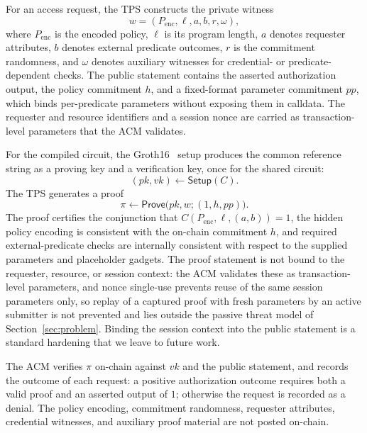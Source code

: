 For an access request, the TPS constructs the private witness
\begin{equation}
	w = (P_{\mathrm{enc}}, \ell, a, b, r, \omega),
\end{equation}
where $P_{\mathrm{enc}}$ is the encoded policy, $\ell$ is its program length, $a$ denotes requester attributes, $b$ denotes external predicate outcomes, $r$ is the commitment randomness, and $\omega$ denotes auxiliary witnesses for credential- or predicate-dependent checks.
The public statement contains the asserted authorization output, the policy commitment $h$, and a fixed-format parameter commitment $\mathit{pp}$, which binds per-predicate parameters without exposing them in calldata.
The requester and resource identifiers and a session nonce are carried as transaction-level parameters that the ACM validates.

For the compiled circuit, the Groth16~\cite{groth2016size} setup produces the common reference string as a proving key and a verification key, once for the shared circuit:
\begin{equation}
	(\mathit{pk}, \mathit{vk}) \leftarrow \mathsf{Setup}(C).
\end{equation}
The TPS generates a proof
\begin{equation}
	\pi \leftarrow \mathsf{Prove}\bigl(\mathit{pk}, w; (1, h, \mathit{pp})\bigr).
\end{equation}
The proof certifies the conjunction that $C(P_{\mathrm{enc}},\ell,(a,b))=1$, the hidden policy encoding is consistent with the on-chain commitment $h$, and required external-predicate checks are internally consistent with respect to the supplied parameters and placeholder gadgets.
The proof statement is not bound to the requester, resource, or session context: the ACM validates these as transaction-level parameters, and nonce single-use prevents reuse of the same session parameters only, so replay of a captured proof with fresh parameters by an active
submitter is not prevented and lies outside the passive threat model of Section~\ref{sec:problem}.
Binding the session context into the public statement is a standard hardening that we leave to future work.

The ACM verifies $\pi$ on-chain against $\mathit{vk}$ and the public statement, and records the outcome of each request: a positive authorization outcome requires both a valid proof and an asserted output of $1$; otherwise the request is recorded as a denial.
The policy encoding, commitment randomness, requester attributes, credential witnesses, and auxiliary proof material are not posted on-chain.

